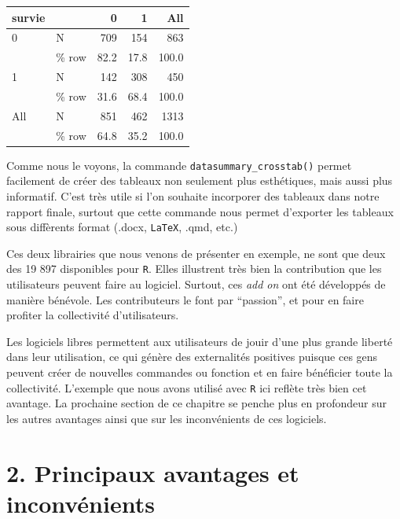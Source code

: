 \documentclass[
  letterpaper,
]{scrbook}
\begin{document}
\begin{table}
\centering
\begin{tabular}[t]{llrrr}
\toprule
survie &   & 0 & 1 & All\\
\midrule
0 & N & 709 & 154 & 863\\
 & \% row & \num{82.2} & \num{17.8} & \num{100.0}\\
1 & N & 142 & 308 & 450\\
 & \% row & \num{31.6} & \num{68.4} & \num{100.0}\\
All & N & 851 & 462 & 1313\\
 & \% row & \num{64.8} & \num{35.2} & \num{100.0}\\
\bottomrule
\end{tabular}
\end{table}

Comme nous le voyons, la commande \texttt{datasummary\_crosstab()}
permet facilement de créer des tableaux non seulement plus esthétiques,
mais aussi plus informatif. C'est très utile si l'on souhaite incorporer
des tableaux dans notre rapport finale, surtout que cette commande nous
permet d'exporter les tableaux sous diffèrents format (.docx,
\texttt{LaTeX}, .qmd, etc.)

Ces deux librairies que nous venons de présenter en exemple, ne sont que
deux des 19 897 disponibles pour \texttt{R}. Elles illustrent très bien
la contribution que les utilisateurs peuvent faire au logiciel. Surtout,
ces \emph{add on} ont été développés de manière bénévole. Les
contributeurs le font par ``passion'', et pour en faire profiter la
collectivité d'utilisateurs.

Les logiciels libres permettent aux utilisateurs de jouir d'une plus
grande liberté dans leur utilisation, ce qui génère des externalités
positives puisque ces gens peuvent créer de nouvelles commandes ou
fonction et en faire bénéficier toute la collectivité. L'exemple que
nous avons utilisé avec \texttt{R} ici reflète très bien cet avantage.
La prochaine section de ce chapitre se penche plus en profondeur sur les
autres avantages ainsi que sur les inconvénients de ces logiciels.


\hypertarget{principaux-avantages-et-inconvuxe9nients}{%
\chapter{2. Principaux avantages et
inconvénients}\label{principaux-avantages-et-inconvuxe9nients}}
\end{document}
